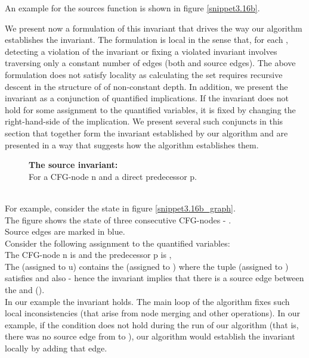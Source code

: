\noindent
An example for the sources function is shown in figure \ref{snippet3.16b}.

\bigskip
\noindent
We present now a formulation of this invariant that drives the way our algorithm establishes the invariant.
The formulation is local in the sense that, for each \GT{}, detecting a violation of the invariant or fixing a violated invariant involves traversing only a constant number of edges (both \GFA{} and source edges). 
The above formulation does not satisfy locality as calculating the set  requires recursive descent in the structure of  of non-constant depth. In addition, we present the invariant as a conjunction of quantified implications. 
If the invariant does not hold for some assignment to the quantified variables, it is fixed by changing the right-hand-side of the implication. We present several such conjuncts in this section that together form the invariant established by our algorithm and are presented in a way that suggests how the algorithm establishes them.

\begin{figure}[H]
\textbf{The source invariant:}\\
For a CFG-node n and a direct predecessor p.\\
\\
\end{figure}

\noindent
For example, consider the state in figure \ref{snippet3.16b_graph}. \\
The figure shows the state of three consecutive CFG-nodes - .\\
Source edges are marked in blue. \\
Consider the following assignment to the quantified variables:\\
The CFG-node n is  and the predecessor p is ,\\
The \GT{}  (assigned to u) contains the \GFA{}  (assigned to ) 
where the tuple  (assigned to ) satisfies  and also 
 - hence the invariant implies that there is a source edge between the \GTs{}  and  ().\\
In our example the invariant holds.
The main loop of the algorithm fixes such local inconsistencies (that arise from node \GT{} merging and other operations).
In our example, if the condition does not hold during the run of our algorithm (that is, there was no source edge from  to ), our algorithm would establish the invariant locally by adding that edge.

